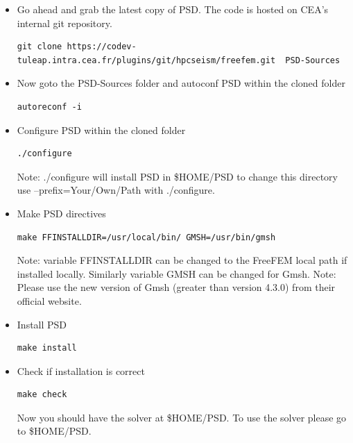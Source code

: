 \documentclass{report}
\begin{document}
\begin{itemize}
\item  Go ahead and grab the latest copy of PSD. The code is hosted on CEA's internal git repository.

\begin{lstlisting}[style=Linux]
git clone https://codev-tuleap.intra.cea.fr/plugins/git/hpcseism/freefem.git  PSD-Sources
\end{lstlisting}

\item  Now goto the {\ttfamily PSD-Sources} folder and autoconf PSD within the  cloned folder

\begin{lstlisting}[style=Linux]
autoreconf -i
\end{lstlisting}

\item Configure  PSD within the  cloned folder
\begin{lstlisting}[style=Linux]
./configure
\end{lstlisting}
Note:   {\ttfamily ./configure will} install PSD in {\ttfamily  \$HOME/PSD } to change this directory use {\ttfamily  --prefix=Your/Own/Path } with {\ttfamily ./configure}. 


\item Make PSD directives
\begin{lstlisting}[style=Linux]
make FFINSTALLDIR=/usr/local/bin/ GMSH=/usr/bin/gmsh
\end{lstlisting}
Note: variable {\ttfamily FFINSTALLDIR} can be changed to the {\ttfamily FreeFEM} local path if installed locally. Similarly variable {\ttfamily  GMSH } can be changed for {\ttfamily  Gmsh}.
Note: Please use the new version of {\ttfamily Gmsh} (greater than version 4.3.0) from their official website.

\item Install PSD
\begin{lstlisting}[style=Linux]
make install
\end{lstlisting}


\item Check if installation is correct 
\begin{lstlisting}[style=Linux]
make check
\end{lstlisting}

Now you should have the solver at {\ttfamily \$HOME/PSD}. To use the solver please go to {\ttfamily \$HOME/PSD}.

\end{itemize}
\end{document}
